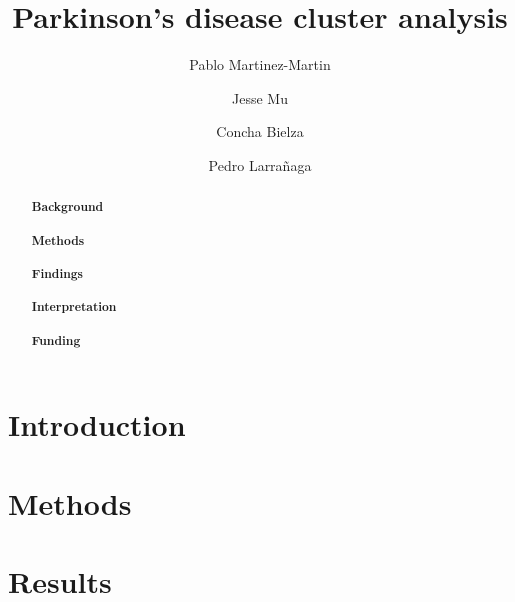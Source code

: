 \documentclass[preprint,3p]{elsarticle} %
\begin{document}
\begin{frontmatter}
\title{Parkinson's disease cluster analysis}

\author[c3]{Pablo Martinez-Martin}
\author[bc]{Jesse Mu}
\author[cig]{Concha Bielza}
\author[cig]{Pedro Larra\~naga}
\address[c3]{Area of Applied Epidemiology, National Centre of Epidemiology and CIBERNED, Carlos III Institute of Health, Madrid, Spain}
\address[bc]{Department of Computer Science, Boston College, Chestnut Hill, Massachusetts, USA}
\address[cig]{Computational Intelligence Group, Polytechnic University of Madrid, Madrid, Spain}

\begin{abstract}
\paragraph{Background}
\paragraph{Methods}
\paragraph{Findings}
\paragraph{Interpretation}
\paragraph{Funding}
\end{abstract}


\end{frontmatter}


\section{Introduction}
\section{Methods}


\section{Results}
\end{document}
